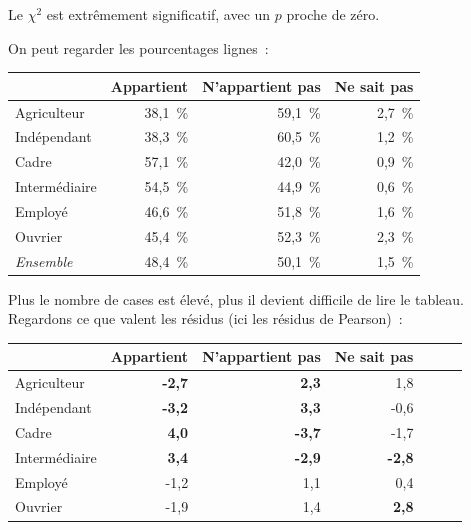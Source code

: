 \documentclass[a4paper,10pt,twoside,francais]{report}
\newcommand{\chid}{$\chi^2$\xspace}
\begin{document}
Le \chid est extrêmement significatif, avec un $p$ proche de zéro.

On peut regarder les pourcentages lignes~:

\begin{table}[H]
  \begin{center}
    \begin{tabular}[!h]{lrrr}
      \toprule
      & Appartient & N'appartient pas & Ne sait pas \\
      \midrule
      Agriculteur & 38,1~\% & 59,1~\% & 2,7~\% \\
      Indépendant & 38,3~\% & 60,5~\% & 1,2~\% \\
      Cadre & 57,1~\% & 42,0~\% & 0,9~\% \\
      Intermédiaire & 54,5~\% & 44,9~\% & 0,6~\% \\
      Employé & 46,6~\% & 51,8~\% & 1,6~\% \\
      Ouvrier & 45,4~\% & 52,3~\% & 2,3~\% \\
      \textit{Ensemble} & 48,4~\% & 50,1~\% & 1,5~\% \\
      \bottomrule
    \end{tabular}
  \end{center}
\end{table}

Plus le nombre de cases est élevé, plus il devient difficile de lire
le tableau. Regardons ce que valent les résidus (ici les résidus de
Pearson)~:

\begin{table}[H]
  \begin{center}
    \begin{tabular}[!h]{lrrrrrr}
      \toprule
      & Appartient & N'appartient pas & Ne sait pas \\
      \midrule
      Agriculteur & \textbf{-2,7} & \textbf{2,3} & 1,8 \\
      Indépendant & \textbf{-3,2} & \textbf{3,3} & -0,6 \\
      Cadre & \textbf{4,0} & \textbf{-3,7} & -1,7 \\
      Intermédiaire & \textbf{3,4} & \textbf{-2,9} & \textbf{-2,8} \\
      Employé & -1,2 & 1,1 & 0,4 \\
      Ouvrier & -1,9 & 1,4 & \textbf{2,8} \\
      \bottomrule
    \end{tabular}
  \end{center}
\end{table}
\end{document}
